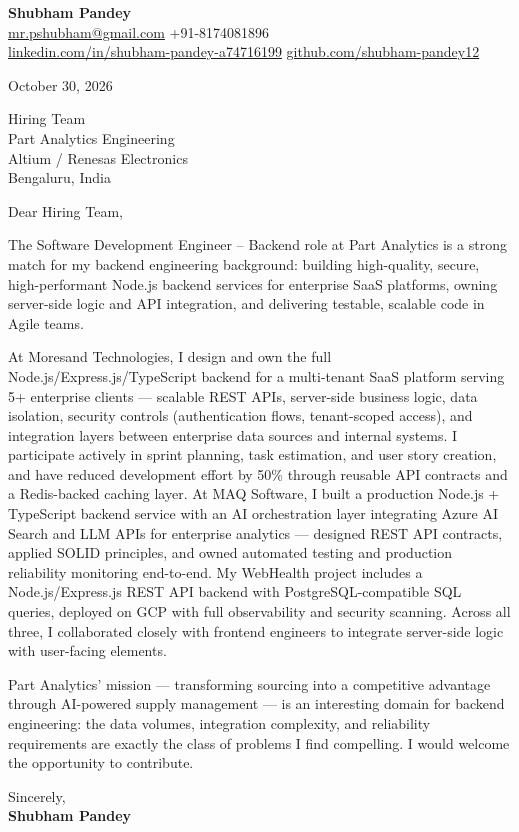 \documentclass[a4paper,11pt]{article}
\begin{document}
\textbf{\Large Shubham Pandey}\\
\href{mailto:mr.pshubham@gmail.com}{mr.pshubham@gmail.com} \quad +91-8174081896\\
\href{https://www.linkedin.com/in/shubham-pandey-a74716199/}{linkedin.com/in/shubham-pandey-a74716199} \quad
\href{https://github.com/shubham-pandey12}{github.com/shubham-pandey12}

\vspace{1em}
October 30, 2026

\vspace{1em}
Hiring Team\\
Part Analytics Engineering\\
Altium / Renesas Electronics\\
Bengaluru, India

\vspace{1em}
Dear Hiring Team,

The Software Development Engineer -- Backend role at Part Analytics is a strong match for my backend engineering background: building high-quality, secure, high-performant Node.js backend services for enterprise SaaS platforms, owning server-side logic and API integration, and delivering testable, scalable code in Agile teams.

At Moresand Technologies, I design and own the full Node.js/Express.js/TypeScript backend for a multi-tenant SaaS platform serving 5+ enterprise clients --- scalable REST APIs, server-side business logic, data isolation, security controls (authentication flows, tenant-scoped access), and integration layers between enterprise data sources and internal systems. I participate actively in sprint planning, task estimation, and user story creation, and have reduced development effort by 50\% through reusable API contracts and a Redis-backed caching layer. At MAQ Software, I built a production Node.js + TypeScript backend service with an AI orchestration layer integrating Azure AI Search and LLM APIs for enterprise analytics --- designed REST API contracts, applied SOLID principles, and owned automated testing and production reliability monitoring end-to-end. My WebHealth project includes a Node.js/Express.js REST API backend with PostgreSQL-compatible SQL queries, deployed on GCP with full observability and security scanning. Across all three, I collaborated closely with frontend engineers to integrate server-side logic with user-facing elements.

Part Analytics' mission --- transforming sourcing into a competitive advantage through AI-powered supply management --- is an interesting domain for backend engineering: the data volumes, integration complexity, and reliability requirements are exactly the class of problems I find compelling. I would welcome the opportunity to contribute.

\vspace{1em}
Sincerely,\\[0.5em]
\textbf{Shubham Pandey}
\end{document}
